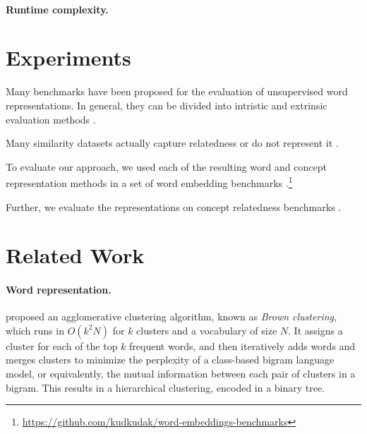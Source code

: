 \documentclass{article}
\begin{document}
\paragraph{Runtime complexity.}



\section{Experiments}\label{sec:experiments}

Many benchmarks have been proposed for the evaluation of unsupervised word
representations.
In general, they can be divided into intristic and extrinsic evaluation methods \cite{schnabel2015evaluation,jastrzebski2017evaluate,alshargi2018concept2vec,bakarov2018survey}.

Many similarity datasets actually capture relatedness or do not represent it
\cite{hill2015simlex,avraham2016improving}.

To evaluate our approach, we used each of the resulting word and concept
representation methods in a set of word embedding benchmarks
\cite{jastrzebski2017evaluate}.\footnote{\url{https://github.com/kudkudak/word-embeddings-benchmarks}}

Further, we evaluate the representations on concept relatedness benchmarks
\cite{levy2015tr9856,eindor2018semantic}.



\section{Related Work}\label{sec:related_work}

\paragraph{Word representation.}
\citet{brown1992class} proposed an agglomerative clustering algorithm,
known as \textit{Brown clustering},
which runs in $O(k^2N)$ for $k$ clusters and a vocabulary of size $N$.
It assigns a cluster for each of the top $k$ frequent words,
and then iteratively adds words and merges clusters to minimize the
perplexity of a class-based bigram language model,
or equivalently, the mutual information between each pair of clusters in a bigram.
This results in a hierarchical clustering, encoded in a binary tree.
\end{document}

